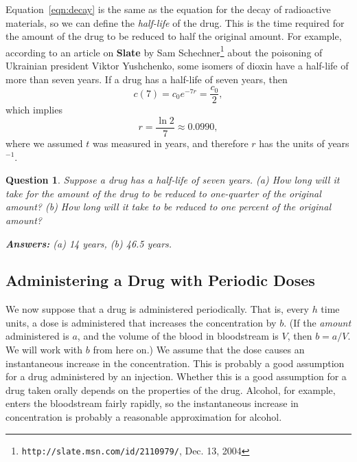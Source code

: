 \documentclass[reqno]{immbook}
\numberwithin{equation}{chapter}
\newtheorem{question}{Question}
\numberwithin{question}{section}
\numberwithin{theorem}{chapter}
\numberwithin{figure}{chapter}
\theoremstyle{definition}
\begin{document}
Equation~\eqref{eqn:decay}
is the same as the equation for the decay of
radioactive materials, so we can define the
\emph{half-life} of the drug. This is the time
required for the amount of the drug to be reduced
to half the original amount.
For example, according to an article on
\textbf{Slate} by Sam Schechner\footnote{\texttt{http://slate.msn.com/id/2110979/}, Dec. 13, 2004}
about the poisoning of Ukrainian president
Viktor Yushchenko, some isomers of 
dioxin have a half-life of more than seven years.
If a drug has a half-life of seven years, then
\begin{equation}
   c(7) = c_0e^{-7r} = \frac{c_0}{2},
\end{equation}
which implies
\begin{equation}
   r = \frac{\ln 2}{7} \approx 0.0990,
\end{equation}
where we assumed $t$ was measured in years, and therefore
$r$ has the units of years$^{-1}$.
\begin{question}
Suppose a drug has a half-life of seven years.
(a) How long will it take for the amount of the drug to
be reduced to one-quarter of the original amount?
(b) How long will it take to be reduced to one percent of the 
original amount?

\hfill \textbf{Answers:} (a) 14 years, (b) 46.5 years.
\end{question}

\subsection*{Administering a Drug with Periodic Doses}
We now suppose that a drug is administered periodically.
That is, every $h$ time units, a dose is administered that
increases the concentration by $b$.
(If the \emph{amount} administered is $a$, and the volume
of the blood in bloodstream is $V$, then $b=a/V$.
We will work with $b$ from here on.)
We assume that the dose causes an instantaneous increase
in the concentration.  This is probably a
good assumption for a drug administered by an injection.
Whether this is a good assumption for a drug taken
orally depends on the properties of the drug.
Alcohol, for example, enters the bloodstream fairly
rapidly, so the instantaneous increase in concentration
is probably a reasonable approximation for alcohol.
\end{document}

